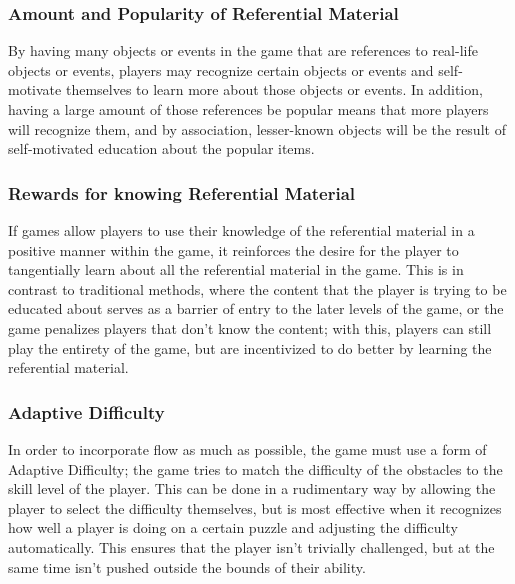 \documentclass[12pt]{report}
\begin{document}
		\subsubsection{Amount and Popularity of Referential Material}
			By having many objects or events in the game that are references to real-life objects or events, players may recognize certain objects or events and self-motivate themselves to learn more about those objects or events. In addition, having a large amount of those references be popular means that more players will recognize them, and by association, lesser-known objects will be the result of self-motivated education about the popular items.
		\subsubsection{Rewards for knowing Referential Material}
			If games allow players to use their knowledge of the referential material in a positive manner within the game, it reinforces the desire for the player to tangentially learn about all the referential material in the game. This is in contrast to traditional methods, where the content that the player is trying to be educated about serves as a barrier of entry to the later levels of the game, or the game penalizes players that don't know the content; with this, players can still play the entirety of the game, but are incentivized to do better by learning the referential material.
		\subsubsection{Adaptive Difficulty}
			In order to incorporate flow as much as possible, the game must use a form of Adaptive Difficulty; the game tries to match the difficulty of the obstacles to the skill level of the player. This can be done in a rudimentary way by allowing the player to select the difficulty themselves, but is most effective when it recognizes how well a player is doing on a certain puzzle and adjusting the difficulty automatically. This ensures that the player isn't trivially challenged, but at the same time isn't pushed outside the bounds of their ability.
\end{document}
